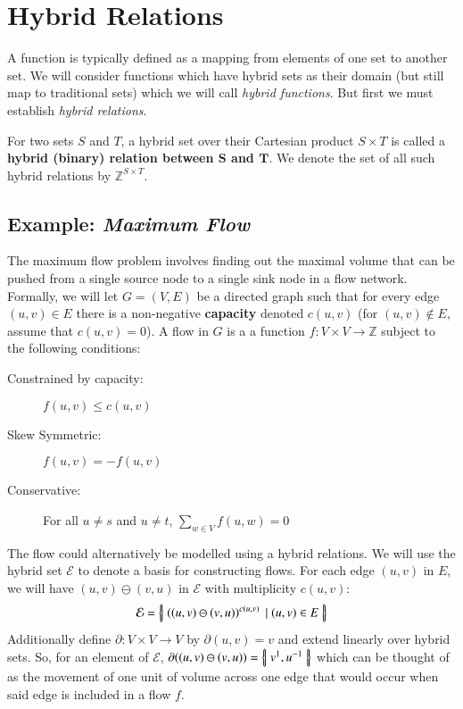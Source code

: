 %
%
\section{Hybrid Relations}


A function is typically defined as a mapping from elements of one set to another set.
We will consider functions which have hybrid sets as their domain (but still map to traditional sets) 
which we will call \emph{hybrid functions}.
But first we must establish \emph{hybrid relations}.

\begin{definition}
	For two sets $S$ and $T$, a hybrid set over their Cartesian product $S \times T$ is called a 
	\textbf{hybrid (binary) relation between $\boldsymbol{S}$ and $\boldsymbol{T}$}.
	We denote the set of all such hybrid relations by $\mathbb{Z}^{S \times T}$. 
\end{definition}


\subsection{Example: \emph{Maximum Flow}}

The maximum flow problem involves finding out the maximal volume that can be pushed from a single source node
to a single sink node in a flow network.
Formally, we will let $G=(V,E)$ be a directed graph such that for every edge $(u,v) \in E$ there is a non-negative
\textbf{capacity} denoted $c(u,v)$ (for $(u,v) \notin E$, assume that $c(u,v)=0$).
A flow in $G$ is a a function $f:V \times V \to \mathbb{Z}$ subject to the following conditions:
\begin{description}
	\item[Constrained by capacity:] $f(u,v) \leq c(u,v)$ 
	\item[Skew Symmetric:] $f(u,v)=-f(u,v)$
	\item[Conservative:] For all $u \neq s$ and $u \neq t$, $\sum_{w \in V} f(u,w) = 0$
\end{description}

The flow could alternatively be modelled using a hybrid relations.
We will use the hybrid set $\mathcal{E}$ to denote a basis for constructing flows.
For each edge $(u,v)$ in $E$, we will have $(u,v) \ominus (v,u)$ in $\mathcal{E}$ with multiplicity $c(u,v)$:
\begin{equation}
	\mathcal{E} = \left\{ \! \left| \;  \left((u,v) \ominus (v,u)\right)^{c(u,v)} \;|\; (u,v) \in E  \; \right| \! \right\}
\end{equation}
Additionally define $\partial : V \times V \to V$ by $\partial(u,v) = v$ and extend linearly over hybrid sets.
So, for an element of $\mathcal{E}$, $\partial((u,v) \ominus (v,u)) = \left\{ \! \left| \; v^1, u^{-1} \; \right| \! \right\}$ which can be thought of as the
movement of one unit of volume across one edge that would occur when said edge is included in a flow $f$.

